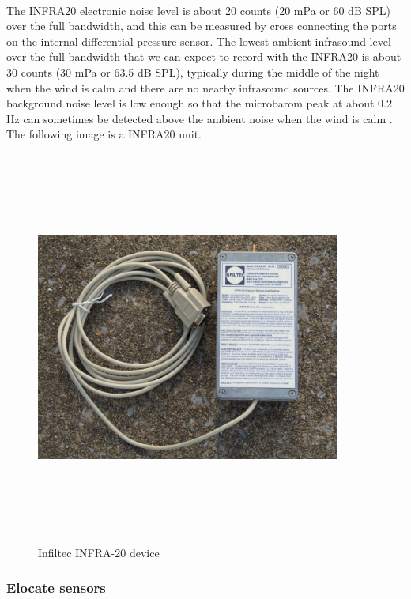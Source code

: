 \documentclass[12pt]{article}
\numberwithin{figure}{section}
\numberwithin{table}{section}
\begin{document}
\paragraph{}
The INFRA20 electronic noise level is about 20 counts (20 mPa or 60 dB SPL) over the full bandwidth, and this can be measured by cross connecting the ports on the internal differential pressure sensor. The lowest ambient infrasound level over the full bandwidth that we can expect to record with the INFRA20 is about 30 counts (30 mPa or 63.5 dB SPL), typically during the middle of the night when the wind is calm and there are no nearby infrasound sources. The INFRA20 background noise level is low enough so that the microbarom peak at about 0.2 Hz can sometimes be detected above the ambient noise when the wind is calm \cite {29}. The following image is a INFRA20 unit.

\begin{figure}[H]
\centering
\includegraphics[width=10cm,height=13cm,keepaspectratio]{INFRA_20.jpg}
\caption{Infiltec INFRA-20 device}
\label{d:p12}
\end{figure}


\newpage
\subsubsection{Elocate sensors}
\end{document}
